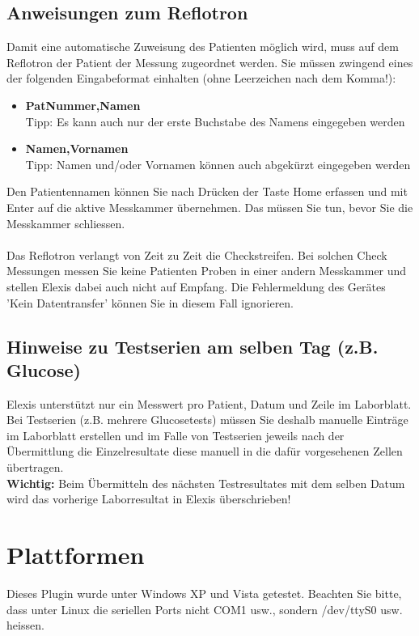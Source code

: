 \documentclass[a4paper]{scrartcl}
\begin{document}
\subsection{Anweisungen zum Reflotron}
Damit eine automatische Zuweisung des Patienten m\"oglich wird, muss auf dem Reflotron der Patient der Messung zugeordnet werden. Sie m\"ussen zwingend eines der folgenden Eingabeformat einhalten (ohne Leerzeichen nach dem Komma!):\\
\begin{itemize}
\item \textbf{PatNummer,Namen}\\Tipp: Es kann auch nur der erste Buchstabe des Namens eingegeben werden
\item \textbf{Namen,Vornamen}\\Tipp: Namen und/oder Vornamen k\"onnen auch abgek\"urzt eingegeben werden
\end{itemize}
Den Patientennamen k\"onnen Sie nach Dr\"ucken der Taste Home erfassen und mit Enter auf die aktive Messkammer \"ubernehmen. Das m\"ussen Sie tun, bevor Sie die Messkammer schliessen.\\
\\
Das Reflotron verlangt von Zeit zu Zeit die Checkstreifen. Bei solchen Check Messungen messen Sie keine Patienten Proben in einer andern Messkammer und stellen Elexis dabei auch nicht auf Empfang. Die Fehlermeldung des Ger\"ates 'Kein Datentransfer'  k\"onnen Sie in diesem Fall ignorieren.
\subsection{Hinweise zu Testserien am selben Tag (z.B. Glucose)}
Elexis unterst\"utzt nur ein Messwert pro Patient, Datum und Zeile im Laborblatt. Bei Testserien (z.B. mehrere Glucosetests) m\"ussen Sie deshalb manuelle Eintr\"age im Laborblatt erstellen und im Falle von Testserien jeweils nach der \"Ubermittlung die Einzelresultate diese manuell in die daf\"ur vorgesehenen Zellen \"ubertragen.\\
\textbf{Wichtig:} Beim \"Ubermitteln des n\"achsten Testresultates mit dem selben Datum wird das vorherige Laborresultat in Elexis \"uberschrieben!
\section{Plattformen}
Dieses Plugin wurde unter Windows XP und Vista getestet. Beachten Sie bitte, dass unter Linux die seriellen Ports nicht COM1 usw., sondern /dev/ttyS0 usw. heissen.
\end{document}
